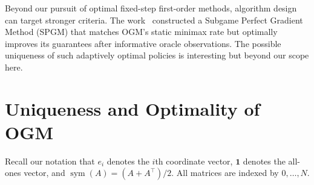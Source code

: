 \documentclass[11pt]{article}
\begin{document}
Beyond our pursuit of optimal fixed-step first-order methods, algorithm design can target stronger criteria. The work~\cite{GSW26} constructed a Subgame Perfect Gradient Method (SPGM) that matches OGM's
static minimax rate but optimally improves its guarantees after
informative oracle observations. The possible uniqueness of such adaptively optimal policies is interesting but beyond our scope here. %



\section{Uniqueness and Optimality of OGM}\label{sec:ogm}

Recall our notation that $e_i$ denotes the $i$th coordinate vector,
$\mathbf 1$ denotes the all-ones vector, and
$\operatorname{sym}(A)=(A+A^\top)/2$. All matrices are indexed by
$0,\dots,N$.
\end{document}
